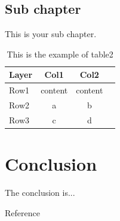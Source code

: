\documentclass[12pt, twoside , openright]{book}
\begin{document}
\section{Sub chapter}\label{sub_chapter32}
This is your sub chapter. \blindtext[2]
\begin{table}[h!]
	\begin{center}
		\caption{This is the example of table2}
		\label{table:table2}
		\begin{tabular}{|l|c|c|c|}
			\hline
			\textbf{Layer} & \textbf{Col1} & \textbf{Col2} \\ %
			\hline
			Row1 & content & content \\ %
			Row2 & a & b \\ %
			Row3 & c & d \\ %
			\hline
		\end{tabular}
	\end{center}
\end{table}




\chapter{Conclusion}
The conclusion is... \blindtext[1] %
\newpage
\mbox{}
\newpage



\begin{center}
	{\chinnesesize Reference}
\end{center}



\newpage
\mbox{}
\newpage
\end{document}
